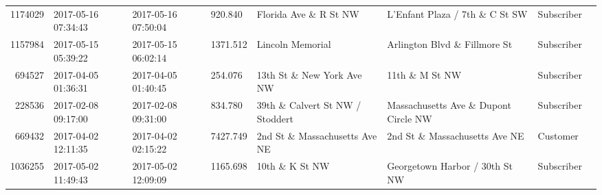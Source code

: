 \documentclass[11pt]{article}
\begin{document}
\begin{description}
\begin{tabular}{r|lllllll}
	 1174029                                                 & 2017-05-16 07:34:43                                     & 2017-05-16 07:50:04                                     &  920.840                                                & Florida Ave \& R St NW                                 & L'Enfant Plaza / 7th \& C St SW                        & Subscriber                                             \\
	 1157984                                                 & 2017-05-15 05:39:22                                     & 2017-05-15 06:02:14                                     & 1371.512                                                & Lincoln Memorial                                        & Arlington Blvd \& Fillmore St                          & Subscriber                                             \\
	  694527                                                 & 2017-04-05 01:36:31                                     & 2017-04-05 01:40:45                                     &  254.076                                                & 13th St \& New York Ave NW                             & 11th \& M St NW                                        & Subscriber                                             \\
	  228536                                                 & 2017-02-08 09:17:00                                     & 2017-02-08 09:31:00                                     &  834.780                                                & 39th \& Calvert St NW / Stoddert                       & Massachusetts Ave \& Dupont Circle NW                  & Subscriber                                             \\
	  669432                                                 & 2017-04-02 12:11:35                                     & 2017-04-02 02:15:22                                     & 7427.749                                                & 2nd St \& Massachusetts Ave NE                         & 2nd St \& Massachusetts Ave NE                         & Customer                                               \\
	 1036255                                               & 2017-05-02 11:49:43                                   & 2017-05-02 12:09:09                                   & 1165.698                                              & 10th \& K St NW                                      & Georgetown Harbor / 30th St NW                        & Subscriber                                           \\

\end{tabular}
\end{description}
\end{document}
